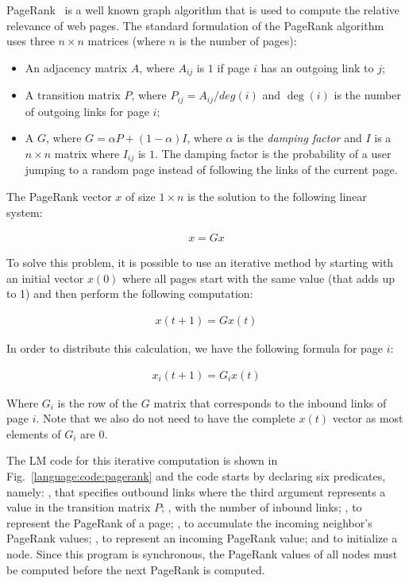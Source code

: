 PageRank~\cite{Page:2001:MNR} is a well known graph algorithm that is used to
compute the relative relevance of web pages. The standard formulation of the
PageRank algorithm uses three $n \times n$ matrices (where $n$ is the number of
pages):

\begin{itemize}

   \item An adjacency matrix $A$, where $A_{ij}$ is $1$ if page $i$ has an
      outgoing link to $j$;

   \item A transition matrix $P$, where $P_{ij} = A_{ij}/deg(i)$ and $\deg(i)$
      is the number of outgoing links for page $i$;

   \item A  $G$, where $G = \alpha P + (1-\alpha)I$, where
      $\alpha$ is the \emph{damping factor} and $I$ is a $n \times n$ matrix
      where $I_{ij}$ is $1$. The damping factor is the probability of a user
      jumping to a random page instead of following the links of the current
      page.

\end{itemize}

The PageRank vector $x$ of size $1 \times n$ is the solution to the following
linear system:

\begin{align}
x = G x
\end{align}

To solve this problem, it is possible to use an iterative method by starting
with an initial vector $x(0)$ where all pages start with the same value (that
adds up to 1) and then perform the following computation:

\begin{align}
x(t + 1) = G x(t)
\end{align}

In order to distribute this calculation, we have the following formula for page
$i$:

\begin{align}
x_{i}(t + 1) = G_{i} x(t)\label{eq:language:pagerank}
\end{align}

Where $G_{i}$ is the row of the $G$ matrix that corresponds to the inbound links
of page $i$. Note that we also do not need to have the complete $x(t)$ vector as
most elements of $G_{i}$ are $0$.

The LM code for this iterative computation is shown in
Fig.~\ref{language:code:pagerank} and the code starts by declaring six
predicates, namely: , that specifies outbound links where the
third argument represents a value in the transition matrix $P$;
, with the number of inbound links; , to
represent the PageRank of a page; , to accumulate the incoming
neighbor's PageRank values; , to represent an incoming
PageRank value; and  to initialize a node.  Since this program is
synchronous, the PageRank values of all nodes must be computed before the next
PageRank is computed.

